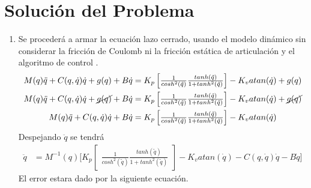 \documentclass[12pt]{article}
\begin{document}
\section{Solución del Problema}
\begin{enumerate}
    \item Se procederá a armar la ecuación lazo cerrado, usando el modelo dinámico sin considerar la fricción de Coulomb ni la fricción estática de articulación y el algoritmo de control .
    \begin{equation}
        \begin{split}
            M(q)\ddot{q}+C(q,\dot{q})\dot{q}+g(q)+B\dot{q}&=K_p
            \begin{bmatrix}
                \frac{1}{cosh^2(\tilde{q})}\frac{tanh(\tilde{q})}{1+tanh^2(\tilde{q})}
            \end{bmatrix}
            -K_vatan(\dot{q})+g(q)\\
            M(q)\ddot{q}+C(q,\dot{q})\dot{q}+\cancel{g(q)}+B\dot{q}&=K_p
            \begin{bmatrix}
                \frac{1}{cosh^2(\tilde{q})}\frac{tanh(\tilde{q})}{1+tanh^2(\tilde{q})}
            \end{bmatrix}
            -K_vatan(\dot{q})+\cancel{g(q)}\\
            M(q)\ddot{q}+C(q,\dot{q})\dot{q}+B\dot{q}&=K_p
            \begin{bmatrix}
                \frac{1}{cosh^2(\tilde{q})}\frac{tanh(\tilde{q})}{1+tanh^2(\tilde{q})}
            \end{bmatrix}
            -K_vatan(\dot{q})
        \end{split}
        \label{eq:closed_loop}
    \end{equation}
    Despejando $\ddot{q}$ se tendrá
    \begin{equation}
        \begin{split}
            \ddot{q}&=M^{-1}(q)\lbrack K_p
            \begin{bmatrix}
                \frac{1}{cosh^2(\tilde{q})}\frac{tanh(\tilde{q})}{1+tanh^2(\tilde{q})}
            \end{bmatrix}
            -K_vatan(\dot{q})-C(q,\dot{q})\dot{q}-B\dot{q}\rbrack
        \end{split}
        \label{eq:state}
    \end{equation}
    El error estara dado por la siguiente ecuación.
    \begin{equation}
        \begin{split}

\end{split}
\end{equation}
\end{enumerate}
\end{document}
